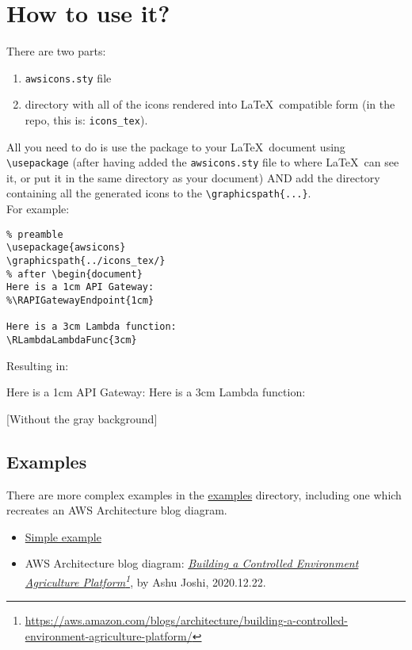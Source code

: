 \documentclass[12pt]{article}
\begin{document}
\section{How to use it?}
There are two parts:
\begin{enumerate}
\item \texttt{awsicons.sty} file
\item directory with all of the icons rendered into \LaTeX\ compatible form (in the repo, this is: \texttt{icons\_tex}).
\end{enumerate}
All you need to do is use the package to your \LaTeX\ document using \texttt{{\textbackslash}usepackage} (after having added the \texttt{awsicons.sty} file to where \LaTeX\ can see it, or put it in the same directory as your document) AND add the directory containing all the generated icons to the \texttt{{\textbackslash}graphicspath\{...\}}.\\

\noindent For example:
\vspace{4mm}

\begin{blockquote}
\begin{verbatim}
% preamble
\usepackage{awsicons} 
\graphicspath{../icons_tex/}
% after \begin{document}
Here is a 1cm API Gateway:
%\RAPIGatewayEndpoint{1cm}

Here is a 3cm Lambda function:
\RLambdaLambdaFunc{3cm}

\end{verbatim}
\end{blockquote}

\noindent Resulting in:\\
\begin{blockquote}
Here is a 1cm API Gateway:
\RAPIGatewayEndpoint{1cm}
Here is a 3cm Lambda function:
\RLambdaLambdaFunc{3cm}

\end{blockquote}

[Without the gray background]
    
\subsection{Examples}
There are more complex examples in the \href{https://github.com/gnewton/awsArchIcons2LaTeX/tree/main/examples}{examples} directory, including one which recreates an AWS Architecture blog diagram.

\begin{itemize}
\item \href{https://github.com/gnewton/awsArchIcons2LaTeX/blob/main/examples/simple.pdf}{Simple example}
\item AWS Architecture blog diagram: \textit{\href{https://github.com/gnewton/awsArchIcons2LaTeX/blob/main/examples/Data-pipeline-Grov-Technologies.pdf}{Building a Controlled Environment Agriculture Platform}\footnote{\url{https://aws.amazon.com/blogs/architecture/building-a-controlled-environment-agriculture-platform/}}}, by Ashu Joshi, 2020.12.22.
\end{itemize}
  
\end{document}

